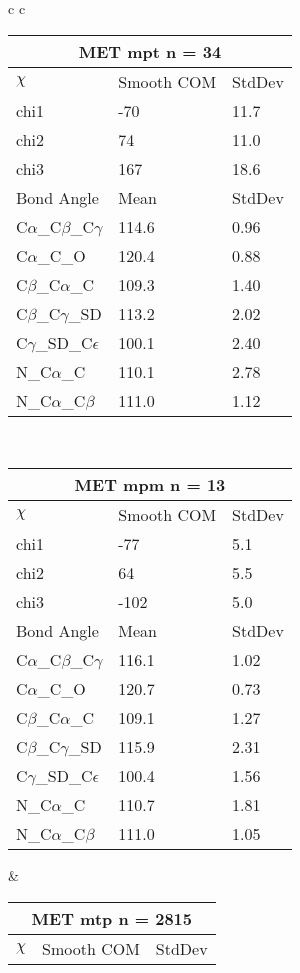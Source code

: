 \begin{longtable}{ c c }
\begin{tabular}{ l l l }
  \toprule
  \multicolumn{3}{c}{MET \textbf{mpt} n = 34} \\ \toprule
  $\chi$       & Smooth COM & StdDev \\ \midrule
  chi1 & -70 & 11.7 \\ 
  chi2 & 74 & 11.0 \\ 
  chi3 & 167 & 18.6 \\ \midrule
  Bond Angle   & Mean     & StdDev \\ \midrule
  C$\alpha$\_C$\beta$\_C$\gamma$ & 114.6 & 0.96\\
  C$\alpha$\_C\_O & 120.4 & 0.88\\
  C$\beta$\_C$\alpha$\_C & 109.3 & 1.40\\
  C$\beta$\_C$\gamma$\_SD & 113.2 & 2.02\\
  C$\gamma$\_SD\_C$\epsilon$ & 100.1 & 2.40\\
  N\_C$\alpha$\_C & 110.1 & 2.78\\
  N\_C$\alpha$\_C$\beta$ & 111.0 & 1.12\\
  \bottomrule
  \end{tabular}
  \\
  \begin{tabular}{ l l l }
  \toprule
  \multicolumn{3}{c}{MET \textbf{mpm} n = 13} \\ \toprule
  $\chi$       & Smooth COM & StdDev \\ \midrule
  chi1 & -77 & 5.1 \\ 
  chi2 & 64 & 5.5 \\ 
  chi3 & -102 & 5.0 \\ \midrule
  Bond Angle   & Mean     & StdDev \\ \midrule
  C$\alpha$\_C$\beta$\_C$\gamma$ & 116.1 & 1.02\\
  C$\alpha$\_C\_O & 120.7 & 0.73\\
  C$\beta$\_C$\alpha$\_C & 109.1 & 1.27\\
  C$\beta$\_C$\gamma$\_SD & 115.9 & 2.31\\
  C$\gamma$\_SD\_C$\epsilon$ & 100.4 & 1.56\\
  N\_C$\alpha$\_C & 110.7 & 1.81\\
  N\_C$\alpha$\_C$\beta$ & 111.0 & 1.05\\
  \bottomrule
  \end{tabular}
  &
  \begin{tabular}{ l l l }
  \toprule
  \multicolumn{3}{c}{MET \textbf{mtp} n = 2815} \\ \toprule
  $\chi$       & Smooth COM & StdDev \\ \midrule

\end{tabular}
\end{longtable}

